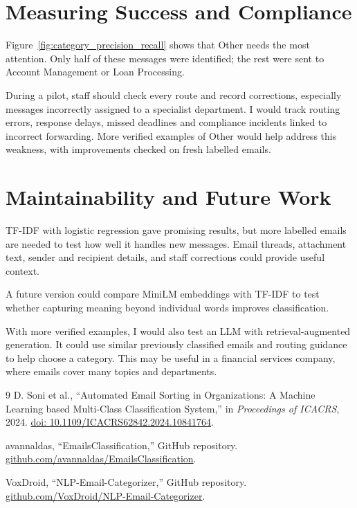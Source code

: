 \documentclass[conference]{IEEEtran}
\begin{document}
\section{Measuring Success and Compliance}
Figure~\ref{fig:category_precision_recall} shows that Other needs the most attention. Only half of these messages were identified; the rest were sent to Account Management or Loan Processing.

During a pilot, staff should check every route and record corrections, especially messages incorrectly assigned to a specialist department. I would track routing errors, response delays, missed deadlines and compliance incidents linked to incorrect forwarding. More verified examples of Other would help address this weakness, with improvements checked on fresh labelled emails.

\section{Maintainability and Future Work}
TF-IDF with logistic regression gave promising results, but more labelled emails are needed to test how well it handles new messages. Email threads, attachment text, sender and recipient details, and staff corrections could provide useful context.

A future version could compare MiniLM embeddings with TF-IDF to test whether capturing meaning beyond individual words improves classification.

With more verified examples, I would also test an LLM with retrieval-augmented generation. It could use similar previously classified emails and routing guidance to help choose a category. This may be useful in a financial services company, where emails cover many topics and departments.

\setlength{\parskip}{0pt}
\begin{thebibliography}{9}
D. Soni et al., ``Automated Email Sorting in Organizations: A Machine Learning based Multi-Class Classification System,'' in \emph{Proceedings of ICACRS}, 2024. \href{https://doi.org/10.1109/ICACRS62842.2024.10841764}{doi: 10.1109/ICACRS62842.2024.10841764}.

avannaldas, ``EmailsClassification,'' GitHub repository. \href{https://github.com/avannaldas/EmailsClassification}{github.com/avannaldas/EmailsClassification}.

VoxDroid, ``NLP-Email-Categorizer,'' GitHub repository. \href{https://github.com/VoxDroid/NLP-Email-Categorizer}{github.com/VoxDroid/NLP-Email-Categorizer}.
\end{thebibliography}
\end{document}
